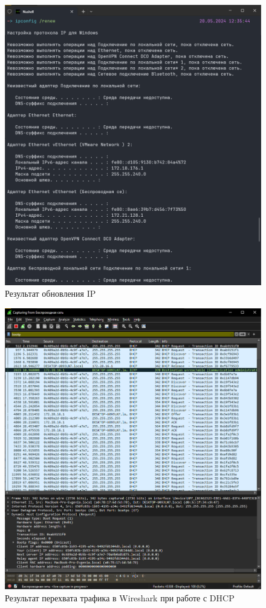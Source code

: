 \begin{figure}[h]
    \centering
    \includegraphics[width=1\linewidth]{res/dhcp-shell-renew.png}
    \caption{Результат обновления IP}
    \label{fig:dhcp-shell-renew}
\end{figure}

\begin{figure}
    \centering
    \includegraphics[width=1\linewidth]{res/dhcp-wireshark.png}
    \caption{Результат перехвата трафика в Wireshark при работе с DHCP}
    \label{fig:dhcp-wireshark}
\end{figure}

